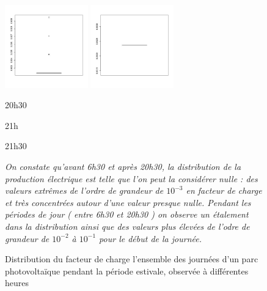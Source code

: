 \begin{figure}[H]
\begin{minipage}{\linewidth}
		\includegraphics[width=0.32\textwidth]{Images/pv_pre/21:00:00.jpg}
		\includegraphics[width=0.32\textwidth]{Images/pv_pre/21:30:00.jpg}
	\end{minipage}
	\begin{minipage}{0.32\textwidth}
		\centering
		20h30
	\end{minipage}
	\begin{minipage}{0.32\textwidth}
		\centering
		21h
	\end{minipage}
	\begin{minipage}{0.32\textwidth}
		\centering
		21h30
	\end{minipage}
	\caption{Distribution du facteur de charge l'ensemble des journées d'un parc photovoltaïque pendant la période estivale, observée à différentes heures}
	\label{fig:boxplot_pv_journee}

	\smallskip

	\emph{On constate qu'avant 6h30 et après 20h30, la distribution de la production électrique est telle que l'on peut la considérer nulle : des valeurs extrêmes de l'ordre de grandeur de $10^{-3}$ en facteur de charge et très concentrées autour d'une valeur presque nulle. Pendant les périodes de jour ( entre 6h30 et 20h30 ) on observe un étalement dans la distribution ainsi que des valeurs plus élevées de l'odre de grandeur de $10^{-2}$ à $10^{-1}$ pour le début de la journée.}

\end{figure}
